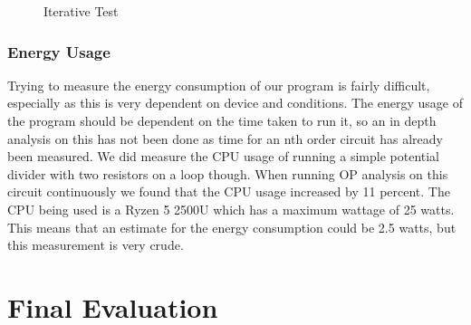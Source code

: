 \documentclass{article}
\begin{document}
\begin{figure}[h]%
    \centering
    \qquad
    \caption{Iterative Test}%
    \label{fig:IterativeTest}%
\end{figure}
\subsubsection{Energy Usage}
Trying to measure the energy consumption of our program is fairly difficult, especially as this is very dependent on device and conditions. The energy usage of the program should be dependent on the time taken to run it, so an in depth analysis on this has not been done as time for an nth order circuit has already been measured. We did measure the CPU usage of running a simple potential divider with two resistors on a loop though. When running OP analysis on this circuit continuously we found that the CPU usage increased by 11 percent. The CPU being used is a Ryzen 5 2500U which has a maximum wattage of 25 watts. This means that an estimate for the energy consumption could be 2.5 watts, but this measurement is very crude. 
\newpage
\section{Final Evaluation}
\end{document}
